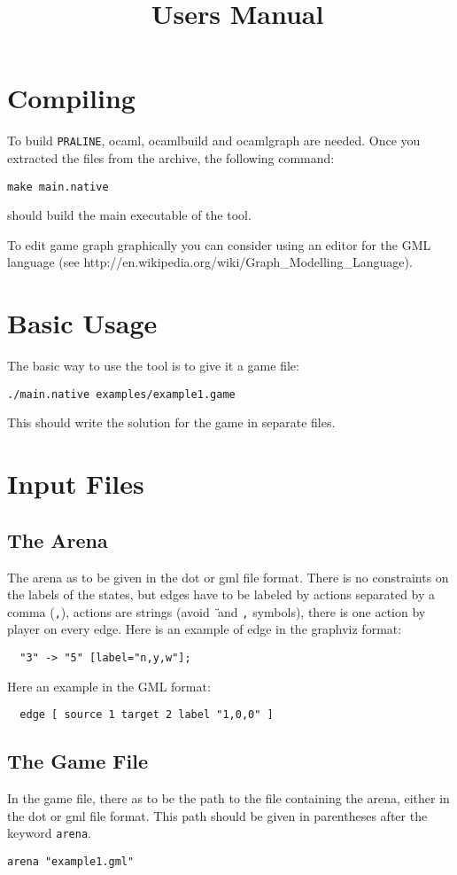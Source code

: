 \documentclass{article}
\title{\praline~Users Manual}
\date{}
\def\praline{\texttt{PRALINE}}
\begin{document}
\maketitle
\section{Compiling}
To build \praline, ocaml, ocamlbuild and ocamlgraph are needed.
Once you extracted the files from the archive, the following command:
\begin{verbatim}
make main.native
\end{verbatim}
should build the main executable of the tool.

To edit game graph graphically you can consider using an editor for
the GML language (see
{http://en.wikipedia.org/wiki/Graph\_Modelling\_Language}).

\section{Basic Usage}
The basic way to use the tool is to give it a game file:
\begin{verbatim}
./main.native examples/example1.game
\end{verbatim}
This should write the solution for the game in separate files.

\section{Input Files}

\subsection{The Arena}
The arena as to be given in the dot or gml file format.
There is no constraints on the labels of the states, but edges have to
be labeled by actions separated by a comma (\texttt{,}), actions are
strings (avoid \texttt{\"} and \texttt{,} symbols), there is one action
by player on every edge.
Here is an example of edge in the graphviz format:
\begin{verbatim}
  "3" -> "5" [label="n,y,w"];
\end{verbatim}
Here an example in the GML format:
\begin{verbatim}
  edge [ source 1 target 2 label "1,0,0" ]
\end{verbatim}


\subsection{The Game File}
In the game file, there as to be the path to the file containing the
arena, either in the dot or gml file format. This path should be given
in parentheses after the keyword \texttt{arena}.
\begin{verbatim}
arena "example1.gml"
\end{verbatim}
\end{document}
